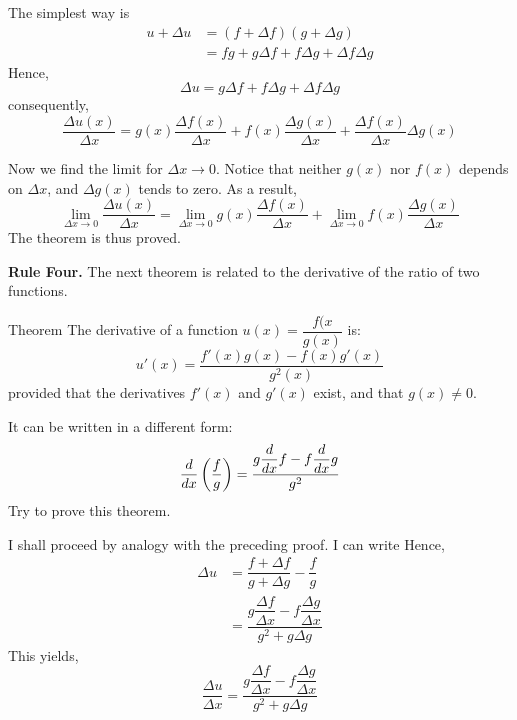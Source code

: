 \athr The simplest way is
\begin{align*}%
u + \Delta u & = (f + \Delta f) (g +  \Delta g)  \\
& = fg + g \Delta f + f \Delta g + \Delta f \Delta g
\end{align*}
Hence,
\begin{equation*}%
\Delta u = g \Delta f + f \Delta g + \Delta f \Delta g
\end{equation*}
 consequently,
\begin{equation*}%
\frac{\Delta u (x)}{\Delta x} = g(x) \frac{\Delta f (x)}{
\Delta x} +  f(x) \frac{\Delta g (x)}{\Delta x} +   \frac{\Delta f (x)}{
\Delta x} \Delta g(x)
\end{equation*}
 
 Now we find the limit for $\Delta x \to 0$. Notice that neither $g (x)$ nor $f (x)$ depends on $\Delta x $, and $\Delta g (x)$ tends to zero. As a result,
 \begin{equation*}%
\lim\limits_{\Delta x \to 0 } \frac{\Delta u (x)}{\Delta x} = \lim\limits_{\Delta x \to 0 } g(x) \frac{\Delta f (x)}{\Delta x} + \lim\limits_{\Delta x \to 0 } f(x) \frac{\Delta g (x)}{\Delta x}
\end{equation*}
  The theorem is thus proved. 
 
 \textbf{Rule Four.} The next theorem is related to the derivative
of the ratio of two functions. 
\begin{mytheo}{Theorem}
The derivative of a function $u (x) = \dfrac{f(x}{g(x)}$ is: 
\begin{equation}%
u' (x) = \frac{f'(x) g(x) - f(x) g'(x)}{g^{2} (x)}
 \label{deriv-div}
\end{equation}
provided that the derivatives $f' (x)$ and $g' (x)$ exist, and that $g (x) \neq 0$.
\end{mytheo}
It can be written in a different form:
 \begin{equation*}%
 \ddx \left(\dfrac{f}{g} \right) =\dfrac{g \ddx f - f \ddx g}{g^{2}}
\end{equation*} 
Try to prove this theorem.
 
\rdr I shall proceed by analogy with the preceding proof. I can write
Hence,
 \begin{align*}%
\Delta u & = \dfrac{f + \Delta f}{g + \Delta g} - \dfrac{f}{g} \\
& = \dfrac{g \dfrac{\Delta f}{\Delta x} - f  \dfrac{\Delta g}{\Delta x} }{g^{2} + g \Delta g}
\end{align*} 
 This yields,
 \begin{equation*}%
\frac{\Delta u}{\Delta x} = \dfrac{g \dfrac{\Delta f}{\Delta x} - f  \dfrac{\Delta g}{\Delta x} }{g^{2} + g \Delta g}
\end{equation*} 


